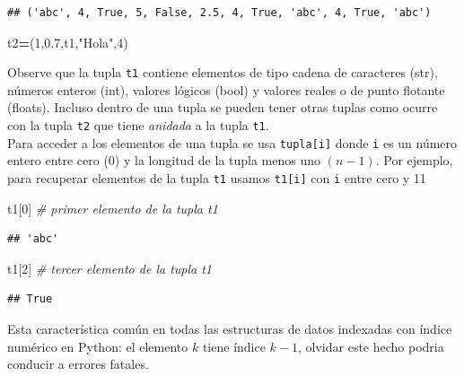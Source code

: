 \documentclass[
]{book}
\newenvironment{Shaded}{\begin{snugshade}}{\end{snugshade}}
\newcommand{\CommentTok}[1]{\textcolor[rgb]{0.56,0.35,0.01}{\textit{#1}}}
\newcommand{\DecValTok}[1]{\textcolor[rgb]{0.00,0.00,0.81}{#1}}
\newcommand{\FloatTok}[1]{\textcolor[rgb]{0.00,0.00,0.81}{#1}}
\newcommand{\NormalTok}[1]{#1}
\newcommand{\OperatorTok}[1]{\textcolor[rgb]{0.81,0.36,0.00}{\textbf{#1}}}
\newcommand{\StringTok}[1]{\textcolor[rgb]{0.31,0.60,0.02}{#1}}
\theoremstyle{definition}
\theoremstyle{definition}
\theoremstyle{definition}
\theoremstyle{definition}
\theoremstyle{remark}
\begin{document}
\begin{verbatim}
## ('abc', 4, True, 5, False, 2.5, 4, True, 'abc', 4, True, 'abc')
\end{verbatim}

\begin{Shaded}
\begin{Highlighting}[]
\NormalTok{t2}\OperatorTok{=}\NormalTok{(}\DecValTok{1}\NormalTok{,}\FloatTok{0.7}\NormalTok{,t1,}\StringTok{"Hola"}\NormalTok{,}\DecValTok{4}\NormalTok{)}
\end{Highlighting}
\end{Shaded}

Observe que la tupla \texttt{t1} contiene elementos de tipo cadena de caracteres (str), números enteros (int), valores lógicos (bool) y valores reales o de punto flotante (floats). Incluso dentro de una tupla se pueden tener otras tuplas como ocurre con la tupla \texttt{t2} que tiene \emph{anidada} a la tupla \texttt{t1}.\\
Para acceder a los elementos de una tupla se usa \texttt{tupla{[}i{]}} donde \texttt{i} es un número entero entre cero (0) y la longitud de la tupla menos uno \((n-1)\). Por ejemplo, para recuperar elementos de la tupla \texttt{t1} usamos \texttt{t1{[}i{]}} con \texttt{i} entre cero y 11

\begin{Shaded}
\begin{Highlighting}[]
\NormalTok{t1[}\DecValTok{0}\NormalTok{] }\CommentTok{\# primer elemento de la tupla t1 }
\end{Highlighting}
\end{Shaded}

\begin{verbatim}
## 'abc'
\end{verbatim}

\begin{Shaded}
\begin{Highlighting}[]
\NormalTok{t1[}\DecValTok{2}\NormalTok{] }\CommentTok{\# tercer elemento de la tupla t1 }
\end{Highlighting}
\end{Shaded}

\begin{verbatim}
## True
\end{verbatim}

Esta característica común en todas las estructuras de datos indexadas con índice numérico en Python: el elemento \(k\) tiene índice \(k-1\), olvidar este hecho podria conducir a errores fatales.
\end{document}
